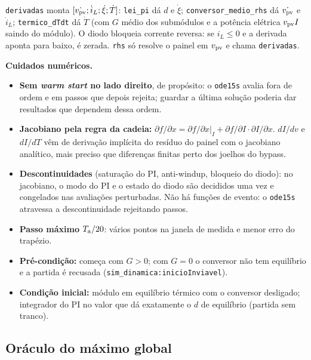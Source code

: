 
\begin{logica}
\texttt{derivadas} monta $[\dot{v_{\mathrm{pv}}};\dot i_L;\dot\xi;\dot T]$: \texttt{lei\_pi} d\'a $d$ e $\dot\xi$; \texttt{conversor\_medio\_rhs} d\'a $\dot{v_{\mathrm{pv}}}$ e $\dot i_L$; \texttt{termico\_dTdt} d\'a $\dot T$ (com $G$ m\'edio dos
subm\'odulos e a pot\^encia el\'etrica $v_{\mathrm{pv}} I$ saindo do m\'odulo). O diodo bloqueia corrente reversa: se $i_L\le0$ e a derivada aponta para baixo, \'e zerada. \texttt{rhs} s\'o resolve o painel em $v_{\mathrm{pv}}$ e chama \texttt{derivadas}.
\end{logica}

\textbf{Cuidados num\'ericos.}
\begin{itemize}
\item \textbf{Sem \emph{warm start} no lado direito}, de prop\'osito: o \texttt{ode15s} avalia fora de ordem e em passos que depois rejeita; guardar a \'ultima solu\c{c}\~ao poderia dar resultados que dependem dessa ordem.
\item \textbf{Jacobiano pela regra da cadeia:} $\partial f/\partial x=\partial f/\partial x|_I+\partial f/\partial I\cdot\partial I/\partial x$. $dI/dv$ e $dI/dT$ v\^em de deriva\c{c}\~ao impl\'icita do res\'iduo do painel com o jacobiano anal\'itico, mais preciso que diferen\c{c}as finitas perto dos joelhos do bypass.
\item \textbf{Descontinuidades} (satura\c{c}\~ao do PI, anti-windup, bloqueio do diodo): no jacobiano, o modo do PI e o estado do diodo s\~ao decididos uma vez e congelados nas avalia\c{c}\~oes perturbadas. N\~ao h\'a fun\c{c}\~oes de evento: o \texttt{ode15s} atravessa a descontinuidade rejeitando passos.
\item \textbf{Passo m\'aximo} $T_{\mathrm{a}}/20$: v\'arios pontos na janela de medida e menor erro do trap\'ezio.
\item \textbf{Pr\'e-condi\c{c}\~ao:} come\c{c}a com $G>0$; com $G=0$ o conversor n\~ao tem equil\'ibrio e a partida \'e recusada (\texttt{sim\_dinamica:inicioInviavel}).
\item \textbf{Condi\c{c}\~ao inicial:} m\'odulo em equil\'ibrio t\'ermico com o conversor desligado; integrador do PI no valor que d\'a exatamente o $d$ de equil\'ibrio (partida sem tranco).
\end{itemize}

\subsection{Or\'aculo do m\'aximo global}

